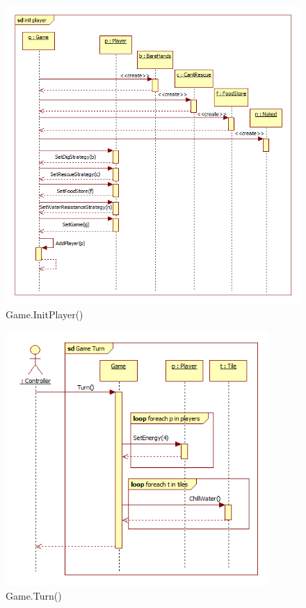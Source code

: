 \begin{figure}[H]
	\begin{center}
		\includegraphics[width=15cm]{chapters/chapter03/seqdiag/Game_init_player.png}
		\caption{Game.InitPlayer()}
		\label{fig:GameInitPlayer}
	\end{center}
\end{figure}
\begin{figure}[H]
	\begin{center}
		\includegraphics[width=10cm]{chapters/chapter03/seqdiag/Game_Turn.png}
		\caption{Game.Turn()}
		\label{fig:GameTurn}
	\end{center}
\end{figure}
